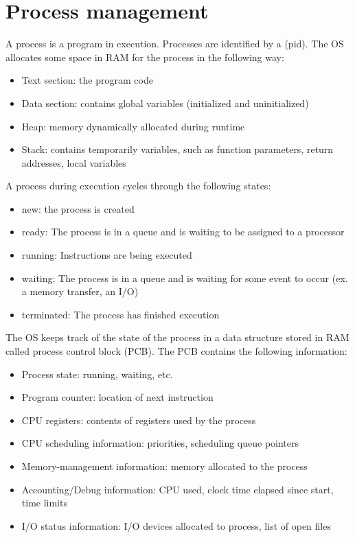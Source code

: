 \chapter{Process management}

A process is a program in execution. Processes are identified by a  (pid). The OS allocates some space in RAM for the process in the following way:

\begin{itemize}
  \item Text section: the program code
  \item Data section: contains global variables (initialized and uninitialized)
  \item Heap: memory dynamically allocated during runtime
  \item Stack: contains temporarily variables, such as function parameters, return addresses, local variables
\end{itemize}


A process during execution cycles through the following states:

\begin{itemize}
  \item new: the process is created
  \item ready: The process is in a queue and is waiting to be assigned to a processor
  \item running: Instructions are being executed
  \item waiting: The process is in a queue and is waiting for some event to occur (ex. a memory transfer, an I/O)
  \item terminated: The process has finished execution
\end{itemize}


The OS keeps track of the state of the process in a data structure stored in RAM called process control block (PCB). The PCB contains the following information:

\begin{itemize}
  \item Process state: running, waiting, etc.
  \item Program counter: location of next instruction
  \item CPU registers: contents of registers used by the process
  \item CPU scheduling information: priorities, scheduling queue pointers
  \item Memory-management information: memory allocated to the process
  \item Accounting/Debug information: CPU used, clock time elapsed since start, time limits
  \item I/O status information: I/O devices allocated to process, list of open files
\end{itemize}

